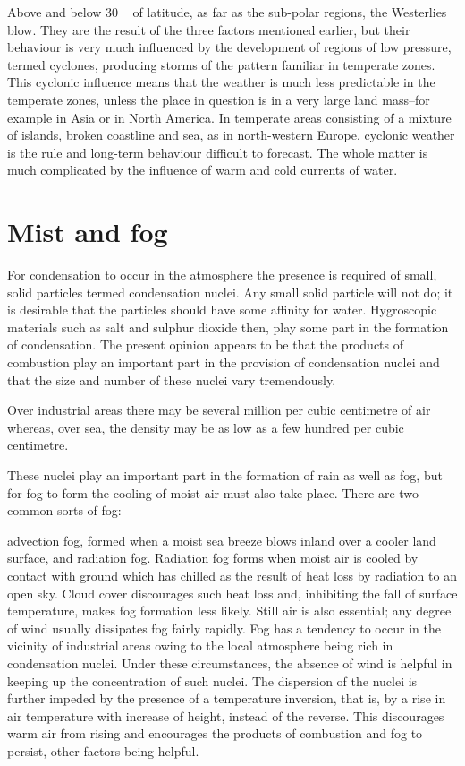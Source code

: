 Above and below 30 ~ of latitude, as far as the sub-polar regions, the Westerlies blow.
They are the result of the three factors mentioned earlier, but their behaviour is very much
influenced by the development of regions of low pressure, termed cyclones, producing
storms of the pattern familiar in temperate zones. This cyclonic influence means that the
weather is much less predictable in the temperate zones, unless the place in question is in
a very large land mass--for example in Asia or in North America. In temperate areas
consisting of a mixture of islands, broken coastline and sea, as in north-western Europe,
cyclonic weather is the rule and long-term behaviour difficult to forecast. The whole
matter is much complicated by the influence of warm and cold currents of water.

\section{Mist and fog}
For condensation to occur in the atmosphere the presence is required of small, solid
particles termed condensation nuclei. Any small solid particle will not do; it is desirable
that the particles should have some affinity for water. Hygroscopic materials such as salt
and sulphur dioxide then, play some part in the formation of condensation. The present
opinion appears to be that the products of combustion play an important part in the provision
of condensation nuclei and that the size and number of these nuclei vary tremendously.

Over industrial areas there may be several million per cubic centimetre of air whereas, over
sea, the density may be as low as a few hundred per cubic centimetre.

These nuclei play an important part in the formation of rain as well as fog, but for fog
to form the cooling of moist air must also take place. There are two common sorts of fog:

advection fog, formed when a moist sea breeze blows inland over a cooler land surface,
and radiation fog. Radiation fog forms when moist air is cooled by contact with ground
which has chilled as the result of heat loss by radiation to an open sky. Cloud cover
discourages such heat loss and, inhibiting the fall of surface temperature, makes fog formation
less likely. Still air is also essential; any degree of wind usually dissipates fog fairly
rapidly. Fog has a tendency to occur in the vicinity of industrial areas owing to the local
atmosphere being rich in condensation nuclei. Under these circumstances, the absence of
wind is helpful in keeping up the concentration of such nuclei. The dispersion of the nuclei
is further impeded by the presence of a temperature inversion, that is, by a rise in air
temperature with increase of height, instead of the reverse. This discourages warm air from
rising and encourages the products of combustion and fog to persist, other factors being
helpful.

